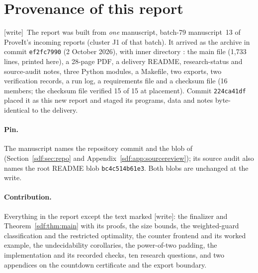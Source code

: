 \documentclass[11pt,a4paper]{article}
\theoremstyle{definition}
\theoremstyle{remark}
\newcommand{\wtag}{\textup{[write]}}
\begin{document}
\section{Provenance of this report}\label{sdf:app:provenance}

\wtag\ The report was built from \emph{one} manuscript, batch-79
manuscript~13 of ProveIt's incoming reports (cluster J1 of that batch). It
arrived as the archive  in
commit \texttt{ef2fc7990} (2 October 2026), with inner directory
: the main file  (1,733 lines,
printed here), a 28-page PDF, a delivery README, research-status and
source-audit notes, three Python modules, a Makefile, two exports, two
verification records, a run log, a requirements file and a checksum file
(16 members; the checksum file verified 15 of 15 at placement). Commit
\texttt{224ca41df} placed it as this new report and staged its programs,
data and notes byte-identical to the delivery.

\paragraph{Pin.} The manuscript names the repository commit
 and the blob
 of
(Section~\ref{sdf:sec:repo} and Appendix~\ref{sdf:app:sourcereview}); its
source audit also names the root README blob \texttt{bc4c514b61e3}. Both
blobs are unchanged at the write.

\paragraph{Contribution.} Everything in the report except the text marked
\wtag: the finalizer and Theorem~\ref{sdf:thm:main} with its proofs, the
size bounds, the weighted-guard classification and the restricted
optimality, the counter frontend and its worked example, the undecidability
corollaries, the power-of-two padding, the implementation and its recorded
checks, ten research questions, and two appendices on the countdown
certificate and the export boundary.
\end{document}
